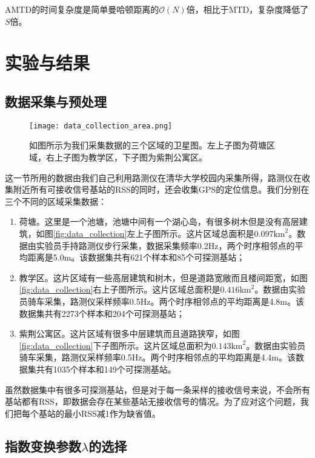 AMTD的时间复杂度是简单曼哈顿距离的$\mathcal{O}(N)$倍，相比于MTD，复杂度降低了$S$倍。

\section{实验与结果} \label{sec:exp}

\subsection{数据采集与预处理}

\begin{figure}
	\centering
	\texttt{[image: data\_collection\_area.png]}
	\caption{如图所示为我们采集数据的三个区域的卫星图。左上子图为荷塘区域，右上子图为教学区，下子图为紫荆公寓区。}
	\label{fig:data_collection}
\end{figure}

这一节所用的数据由我们自己利用路测仪在清华大学校园内采集所得，路测仪在收集附近所有可接收信号基站的RSS的同时，还会收集GPS的定位信息。我们分别在三个不同的区域采集数据：
\begin{enumerate}
	\item 荷塘。这里是一个池塘，池塘中间有一个湖心岛，有很多树木但是没有高层建筑，如图\eqref{fig:data_collection}左上子图所示。这片区域总面积是$0.097\mathrm{km}^2$。数据由实验员手持路测仪步行采集，数据采集频率0.2Hz，两个时序相邻点的平均距离是5.0m。该数据集共有621个样本和85个可探测基站；
	\item 教学区。这片区域有一些高层建筑和树木，但是道路宽敞而且楼间距宽，如图\eqref{fig:data_collection}右上子图所示。这片区域总面积是$0.416\mathrm{km}^2$。数据由实验员骑车采集，路测仪采样频率0.5Hz。两个时序相邻点的平均距离是4.8m。该数据集共有2273个样本和204个可探测基站；
	\item 紫荆公寓区。这片区域有很多中层建筑而且道路狭窄，如图\eqref{fig:data_collection}下子图所示。这片区域总面积为$0.143\mathrm{km}^2$。数据由实验员骑车采集，路测仪采样频率0.5Hz。两个时序相邻点的平均距离是4.4m。该数据集共有1035个样本和149个可探测基站。
\end{enumerate}

虽然数据集中有很多可探测基站，但是对于每一条采样的接收信号来说，不会所有基站都有RSS，即数据会存在某些基站无接收信号的情况。为了应对这个问题，我们把每个基站的最小RSS减1作为缺省值。

\subsection{指数变换参数$\lambda$的选择} \label{subsec:lambda}

